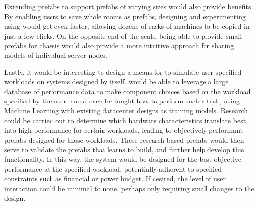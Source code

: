 \documentclass[11pt]{article}
\begin{document}
		Extending prefabs to support prefabs of varying sizes would also provide benefits.
		By enabling users to save whole rooms as prefabs, designing and experimenting using \opendc{} would get even faster, allowing dozens of racks of machines to be copied in just a few clicks.
		On the opposite end of the scale, being able to provide small prefabs for chassis would also provide a more intuitive approach for sharing models of individual server nodes.

		Lastly, it would be interesting to design a means for \opendc{} to simulate user-specified workloads on systems designed by \opendc{} itself. 
		\opendc{} would be able to leverage a large database of performance data to make component choices based on the workload specified by the user. 
		\opendc{} could even be taught how to perform such a task, using Machine Learning with existing datacenter designs as training models.
		Research could be carried out to determine which hardware characteristics translate best into high performance for certain workloads, leading to objectively performant prefabs designed for those workloads.
		These research-based prefabs would then serve to validate the prefabs that \opendc{} learns to build, and further help develop this functionality.
		In this way, the system would be designed for the best objective performance at the specified workload, potentially adherent to specified constraints such as financial or power budget.
		If desired, the level of user interaction could be minimal to none, perhaps only requiring small changes to the design.







\newpage


\newpage
\appendix
\end{document}
